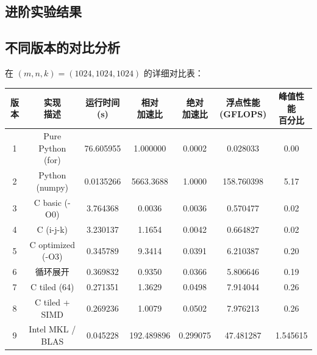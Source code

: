 \documentclass{SYSUReport}
\begin{document}
\subsection{进阶实验结果}

\subsection{不同版本的对比分析}
在 $(m,n,k)=(1024,1024,1024)$ 的详细对比表：
\begin{table}[h]
\centering
\small
\begin{tabular}{|c|c|c|c|c|c|c|}
\hline
版本 & \shortstack{实现\\描述} & \shortstack{运行时间\\ (s)} & \shortstack{相对\\加速比} & \shortstack{绝对\\加速比} & \shortstack{浮点性能\\ (GFLOPS)} & \shortstack{峰值性能\\百分比} \\
\hline
1 & Pure Python (for) & 76.605955 & 1.000000 & 0.0002 & 0.028033 & 0.00 \\
\hline
2 & Python (numpy) & 0.0135266 & 5663.3688 & 1.0000 & 158.760398 & 5.17 \\
\hline
3 & C basic (-O0) & 3.764368 & 0.0036 & 0.0036 & 0.570477 & 0.02 \\
\hline
4 & C (i-j-k) & 3.230137 & 1.1654 & 0.0042 & 0.664827 & 0.02 \\
\hline
5 & C optimized (-O3) & 0.345789 & 9.3414 & 0.0391 & 6.210387 & 0.20 \\
\hline
6 & 循环展开 & 0.369832 & 0.9350 & 0.0366 & 5.806646 & 0.19 \\
\hline
7 & C tiled (64) & 0.271351 & 1.3629 & 0.0498 & 7.914044 & 0.26 \\
\hline
8 & C tiled + SIMD & 0.269236 & 1.0079 & 0.0502 & 7.976213 & 0.26 \\
\hline
9 & Intel MKL / BLAS & 0.045228 & 192.489896 & 0.299075 & 47.481287 & 1.545615 \\
\hline
\end{tabular}
\end{table}
\end{document}
